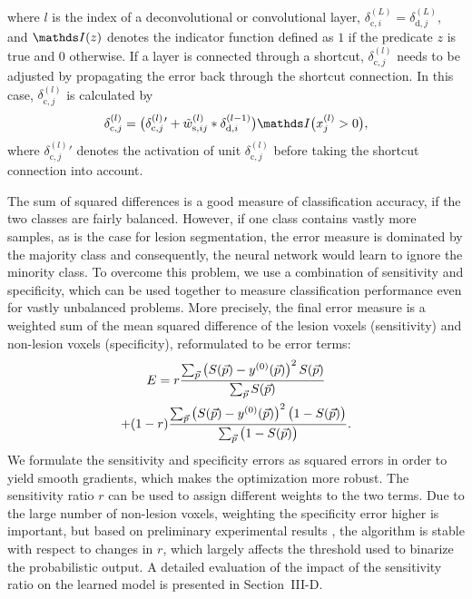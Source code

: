where $l$ is the index of a deconvolutional or convolutional layer,
$\delta^{(L)}_{\text{c},i} = \delta^{(L)}_{\text{d},j}$, and $\I(z)$ denotes the
indicator function defined as $1$ if the predicate $z$ is true and $0$
otherwise. If a layer is connected through a shortcut,
$\delta^{(l)}_{\text{c},j}$ needs to be adjusted by propagating the error back
through the shortcut connection. In this case, $\delta^{(l)}_{\text{c},j}$ is
calculated by
\begin{equation}
\delta^{(l)}_{\text{c},j} =
\big(\delta^{(l)}_{\text{c},j}{}'+
\tilde{w}^{(l)}_{\text{s},ij}*\delta^{(l-1)}_{\text{d},i}\big)\I\big(x^{(l)}_j
> 0\big),
\label{eq:deltas}
\end{equation}
where $\delta^{(l)}_{\text{c},j}{}'$ denotes the activation of unit
$\delta^{(l)}_{\text{c},j}$ before taking the shortcut connection into account.


The sum of squared differences is a good measure of classification accuracy, if
the two classes are fairly balanced. However, if one class contains vastly more
samples, as is the case for lesion segmentation, the error measure is dominated
by the majority class and consequently, the neural network would learn to ignore
the minority class. To overcome this problem, we use a combination of
sensitivity and specificity, which can be used together to measure
classification performance even for vastly unbalanced problems. More precisely,
the final error measure is a weighted sum of the mean squared difference of the
lesion voxels (sensitivity) and non-lesion voxels (specificity), reformulated to
be error terms:
\begin{multline} 
E = r\frac{\textstyle\sum_{\vect{p}} \left(S(\vect{p}) -
y^{(0)}(\vect{p})\right)^2 S(\vect{p})}{\textstyle\sum_{\vect{p}} S(\vect{p})}
\\
 + (1-r)\frac{\textstyle\sum_{\vect{p}} \left(S(\vect{p}) -
y^{(0)}(\vect{p})\right)^2 \big(1 - S(\vect{p})\big)}{%
\textstyle\sum_{\vect{p}}\big(1 - S(\vect{p})\big)}.
\end{multline}
We formulate the sensitivity and specificity errors as squared errors in order
to yield smooth gradients, which makes the optimization more robust. The
sensitivity ratio $r$ can be used to assign different weights to the two terms.
Due to the large number of non-lesion voxels, weighting the specificity error
higher is important, but based on preliminary experimental results \cite{brosch2015},
the algorithm is stable with respect to changes in $r$, which largely affects the
threshold used to binarize the probabilistic output. A detailed evaluation of
the impact of the sensitivity ratio on the learned model is presented in
Section~III-D.

